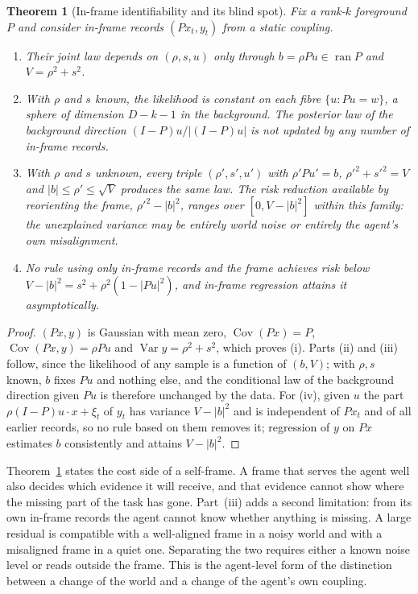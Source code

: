 \documentclass[12pt]{article}
\newtheorem{theorem}{Theorem}
\theoremstyle{definition}
\begin{document}
\begin{theorem}[In-frame identifiability and its blind spot]
\label{thm:blind}
Fix a rank-$k$ foreground $P$ and consider in-frame records $(Px_t,y_t)$ from a static coupling.
\begin{enumerate}
\item[(i)] Their joint law depends on $(\rho,s,u)$ only through $b=\rho Pu\in\operatorname{ran}P$ and $V=\rho^2+s^2$.
\item[(ii)] With $\rho$ and $s$ known, the likelihood is constant on each fibre $\{u:Pu=w\}$, a sphere of dimension $D-k-1$ in the background. The posterior law of the background direction $(I-P)u/|(I-P)u|$ is not updated by any number of in-frame records.
\item[(iii)] With $\rho$ and $s$ unknown, every triple $(\rho',s',u')$ with $\rho'Pu'=b$, $\rho'^2+s'^2=V$ and $|b|\le\rho'\le\sqrt V$ produces the same law. The risk reduction available by reorienting the frame, $\rho'^2-|b|^2$, ranges over $[0,V-|b|^2]$ within this family: the unexplained variance may be entirely world noise or entirely the agent's own misalignment.
\item[(iv)] No rule using only in-frame records and the frame achieves risk below $V-|b|^2=s^2+\rho^2(1-|Pu|^2)$, and in-frame regression attains it asymptotically.
\end{enumerate}
\end{theorem}

\begin{proof}
$(Px,y)$ is Gaussian with mean zero, $\operatorname{Cov}(Px)=P$, $\operatorname{Cov}(Px,y)=\rho Pu$ and $\operatorname{Var}y=\rho^2+s^2$, which proves (i). Parts (ii) and (iii) follow, since the likelihood of any sample is a function of $(b,V)$; with $\rho,s$ known, $b$ fixes $Pu$ and nothing else, and the conditional law of the background direction given $Pu$ is therefore unchanged by the data. For (iv), given $u$ the part $\rho(I-P)u\cdot x+\xi_t$ of $y_t$ has variance $V-|b|^2$ and is independent of $Px_t$ and of all earlier records, so no rule based on them removes it; regression of $y$ on $Px$ estimates $b$ consistently and attains $V-|b|^2$.
\end{proof}

Theorem~\ref{thm:blind} states the cost side of a self-frame. A frame that serves the agent well also decides which evidence it will receive, and that evidence cannot show where the missing part of the task has gone. Part~(iii) adds a second limitation: from its own in-frame records the agent cannot know whether anything is missing. A large residual is compatible with a well-aligned frame in a noisy world and with a misaligned frame in a quiet one. Separating the two requires either a known noise level or reads outside the frame. This is the agent-level form of the distinction between a change of the world and a change of the agent's own coupling.
\end{document}

